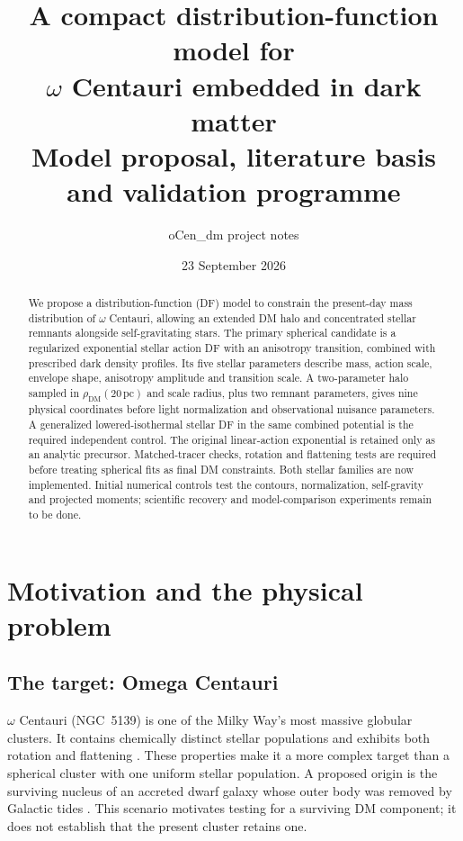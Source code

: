 \documentclass[11pt,a4paper]{article}
\title{\vspace{-1cm}A compact distribution-function model for\texorpdfstring{\\[3pt]$\omega$ Centauri embedded in dark matter}{ Omega Centauri embedded in dark matter}\\[6pt]
\large Model proposal, literature basis and validation programme}
\author{oCen\_dm project notes}
\date{23 September 2026}
\newcommand{\pc}{\,\mathrm{pc}}
\newcommand{\dm}{\mathrm{DM}}
\begin{document}
\maketitle

\begin{abstract}
We propose a distribution-function (DF) model to constrain the present-day
mass distribution of $\omega$ Centauri, allowing an extended DM halo and
concentrated stellar remnants alongside self-gravitating stars. The primary
spherical candidate is a regularized exponential stellar action DF with an
anisotropy transition, combined with prescribed dark density profiles. Its
five stellar parameters describe mass, action scale, envelope shape,
anisotropy amplitude and transition scale. A two-parameter halo sampled in
$\rho_\dm(20\pc)$ and scale radius, plus two remnant parameters, gives nine
physical coordinates before light normalization and observational nuisance
parameters. A generalized lowered-isothermal stellar DF in the same combined
potential is the required independent control. The original linear-action
exponential is retained only as an analytic precursor. Matched-tracer checks,
rotation and flattening tests are required before treating spherical fits as
final DM constraints. Both stellar families are now implemented. Initial
numerical controls test the contours, normalization, self-gravity and projected
moments; scientific recovery and model-comparison experiments remain to be done.
\end{abstract}

\section{Motivation and the physical problem}

\subsection{The target: Omega Centauri}

$\omega$ Centauri (NGC~5139) is one of the Milky Way's most massive globular
clusters. It contains chemically distinct stellar populations and exhibits
both rotation and flattening \citep{2017MNRAS.468.4429Z}. These properties
make it a more complex target than a spherical cluster with one uniform
stellar population. A proposed origin is the surviving nucleus of an
accreted dwarf galaxy whose outer body was removed by Galactic tides
\citep{2003MNRAS.346L..11B}. This scenario motivates testing for a surviving
DM component; it does not establish that the present cluster retains one.
\end{document}

